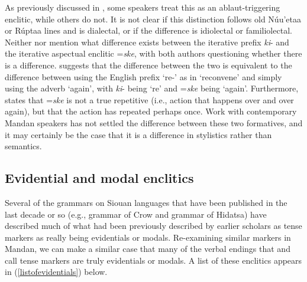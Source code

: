 As previously discussed in , some speakers treat this as an ablaut-trig\-gering enclitic, while others do not. It is not clear if this distinction follows old Núu'etaa or Rúptaa lines and is dialectal, or if the difference is idiolectal or familiolectal. Neither \citet[480]{hollow1970} nor \citet[29]{mixco1997a} mention what difference exists between the iterative prefix \textit{ki}- and the iterative aspectual enclitic =\textit{ske}, with both authors questioning whether there is a difference. \citet[11]{kennard1936} suggests that the difference between the two is equivalent to the difference between using the English prefix `{re}-' as in `{reconvene}' and simply using the adverb `again', with \textit{ki}- being `re' and =\textit{ske} being `again'. Furthermore, \citeauthor{kennard1936} states that =\textit{ske} is not a true repetitive (i.e., action that happens over and over again), but that the action has repeated perhaps once. Work with contemporary Mandan speakers has not settled the difference between these two formatives, and it may certainly be the case that it is a difference in stylistics rather than semantics.

\subsection{Evidential and modal enclitics}

Several of the grammars on Siouan languages that have been published in the last decade or so (e.g.,  grammar of Crow and  grammar of Hidatsa) have described much of what had been previously described by earlier scholars as tense markers as really being evidentials or modals. Re-examining similar markers in Mandan, we can make a similar case that many of the verbal endings that \citet{hollow1970} and \citet{mixco1997a} call tense markers are truly evidentials or modals. A list of these enclitics appears in (\ref{listofevidentials}) below.


